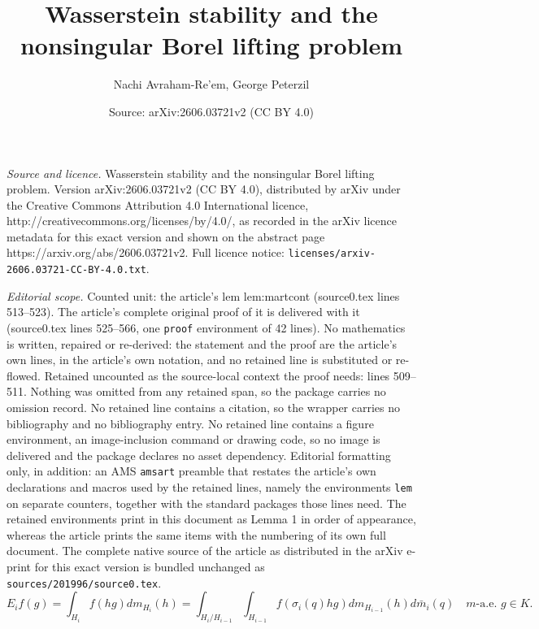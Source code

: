\documentclass[10pt,a4paper]{amsart}
\title{Wasserstein stability and the nonsingular Borel lifting problem}
\author{Nachi Avraham-Re'em, George Peterzil}
\date{Source: arXiv:2606.03721v2 (CC BY 4.0)}
\begin{document}
\maketitle

\noindent\emph{Source and licence.} Wasserstein stability and the nonsingular Borel lifting problem. Version arXiv:2606.03721v2 (CC BY 4.0), distributed by arXiv under the Creative Commons Attribution 4.0 International licence, http://creativecommons.org/licenses/by/4.0/, as recorded in the arXiv licence metadata for this exact version and shown on the abstract page https://arxiv.org/abs/2606.03721v2. Full licence notice: \texttt{licenses/arxiv-2606.03721-CC-BY-4.0.txt}.\par\smallskip

\noindent\textit{Editorial scope.} Counted unit: the article's lem lem:martcont (source0.tex lines 513--523). The article's complete original proof of it is delivered with it (source0.tex lines 525--566, one \texttt{proof} environment of 42 lines). No mathematics is written, repaired or re-derived: the statement and the proof are the article's own lines, in the article's own notation, and no retained line is substituted or re-flowed.  Retained uncounted as the source-local context the proof needs: lines 509--511.  Nothing was omitted from any retained span, so the package carries no omission record.  No retained line contains a citation, so the wrapper carries no bibliography and no bibliography entry.  No retained line contains a figure environment, an image-inclusion command or drawing code, so no image is delivered and the package declares no asset dependency.  Editorial formatting only, in addition: an AMS \texttt{amsart} preamble that restates the article's own declarations and macros used by the retained lines, namely the environments \texttt{lem} on separate counters, together with the standard packages those lines need.  The retained environments print in this document as Lemma 1 in order of appearance, whereas the article prints the same items with the numbering of its own full document.  The complete native source of the article as distributed in the arXiv e-print for this exact version is bundled unchanged as \texttt{sources/201996/source0.tex}.
\begin{equation}\label{eq:Weil}
E_{i}f\left(g\right)=\int_{H_{i}}f\left(hg\right)dm_{H_{i}}\left(h\right)=\int_{H_{i}/H_{i-1}}\int_{H_{i-1}}f\left(\sigma_{i}\left(q\right)hg\right)dm_{H_{i-1}}\left(h\right)d\bar{m}_{i}\left(q\right)\quad m\text{-a.e. }g\in K.
\end{equation}
\end{document}
